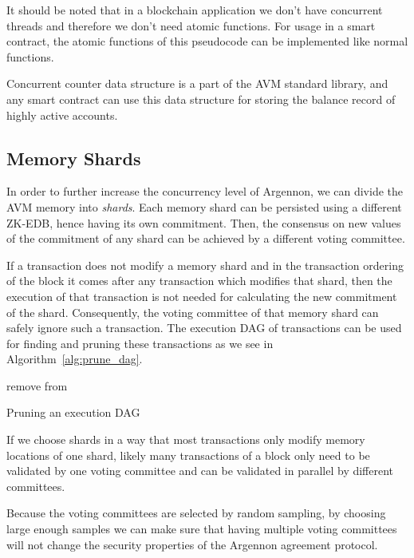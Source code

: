 It should be noted that in a blockchain application we don't have concurrent threads and therefore we don't need
atomic functions. For usage in a smart contract, the atomic functions of this pseudocode can be implemented like
normal functions.

Concurrent counter data structure is a part of the AVM standard library, and any smart contract can use this data
structure for storing the balance record of highly active accounts.

\subsection{Memory Shards}\label{subsec:memory-shards}

In order to further increase the concurrency level of Argennon, we can divide the AVM memory into \emph{shards}.
Each memory shard can be persisted using a different ZK-EDB, hence having its own commitment. Then, the
consensus on new values of the commitment of any shard can be achieved by a different voting committee.

If a transaction does not modify a memory shard and in the transaction ordering of the block it comes after
any transaction which modifies that shard, then the execution of that transaction is not needed for calculating
the new commitment of the shard. Consequently, the voting committee of that memory shard can safely ignore such a
transaction. The execution DAG of transactions can be used for finding and pruning these transactions as
we see in Algorithm~\ref{alg:prune_dag}.

\begin{algorithm}
    \DontPrintSemicolon
    \BlankLine
    {
        \RPrune{\V}\;
    }
    \BlankLine
    \Fn{\RPrune{\V}}
    {
        {
            remove \V from \Graph\;
            {
                \;
            }
        }
    }
    \caption{Pruning an execution DAG}\label{alg:prune_dag}
\end{algorithm}

If we choose shards in a way that most transactions only modify memory locations of one shard,
likely many transactions of a block only need to be validated by one voting committee and can be validated in
parallel by different committees.

Because the voting committees are selected by random sampling, by choosing large enough samples we can make sure
that having multiple voting committees will not change the security properties of the Argennon agreement protocol.